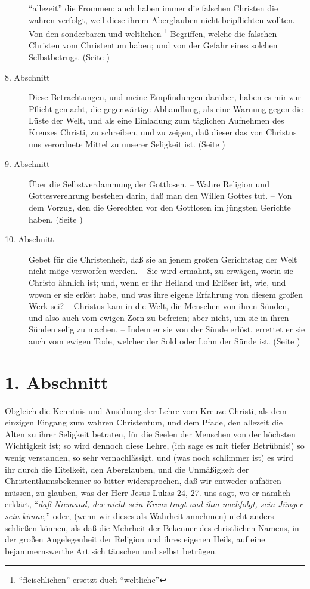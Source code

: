 \begin{description}
{"`allezeit"'} die Frommen; auch haben immer die falschen Christen die wahren
verfolgt, weil diese ihrem Aberglauben nicht beipflichten wollten. -- Von den
sonderbaren und weltlichen \footnote{"`fleischlichen"' ersetzt duch "`weltliche"'} 
Begriffen, welche die falschen Christen vom
Christentum haben; und von der Gefahr eines solchen Selbstbetrugs. (Seite
\pageref{kap1_ab7})
\item[8. Abschnitt] Diese Betrachtungen, und meine Empfindungen darüber, haben
es mir zur Pflicht gemacht, die gegenwärtige Abhandlung, als eine Warnung gegen
die Lüste der Welt, und als eine Einladung zum täglichen Aufnehmen des Kreuzes
Christi, zu schreiben, und zu zeigen, daß dieser das von Christus uns verordnete
Mittel zu unserer Seligkeit ist. (Seite \pageref{kap1_ab8})
\item[9. Abschnitt] Über die Selbstverdammung der Gottlosen. -- Wahre Religion
und Gottesverehrung  bestehen darin, daß man den 
Willen Gottes tut. -- Von dem
Vorzug, den die Gerechten vor den Gottlosen im jüngsten Gerichte haben. (Seite
\pageref{kap1_ab9})
\item[10. Abschnitt] Gebet für die Christenheit, daß sie an jenem großen
Gerichtstag der Welt nicht möge verworfen werden. -- Sie wird ermahnt, zu
erwägen, worin sie Christo ähnlich ist; und, wenn er ihr Heiland und Erlöser
ist, wie, und wovon er sie erlöst habe, und was ihre eigene Erfahrung von diesem
großen Werk sei? -- Christus kam in die Welt, die Menschen von ihren Sünden, und
also auch vom ewigen Zorn zu befreien; aber nicht, um sie in ihren Sünden selig
zu machen. -- Indem er sie von der Sünde erlöst, errettet er sie auch vom ewigen
Tode, welcher der Sold oder Lohn der Sünde ist. (Seite \pageref{kap1_ab10})
\end{description}
\normalsize


\section{1. Abschnitt} \label{kap1_ab1}

Obgleich die Kenntnis und Ausübung der Lehre vom Kreuze Christi, als dem
einzigen Eingang zum wahren Christentum, und dem Pfade, den allezeit die Alten
zu ihrer Seligkeit betraten, für die Seelen der Menschen von der höchsten
Wichtigkeit ist; so wird dennoch diese Lehre, (ich sage es mit tiefer
Betrübnis!) so wenig verstanden, so sehr vernachlässigt, und (was noch
schlimmer ist) es wird ihr durch die Eitelkeit, den Aberglauben, und die
Unmäßigkeit der Christenthumsbekenner so bitter widersprochen, daß wir entweder
aufhören müssen, zu glauben, was der Herr Jesus Lukas 24,
27. uns sagt, wo er nämlich erklärt, "`\textit{daß
Niemand, der nicht sein Kreuz tragt und ihm nachfolgt, sein Jünger sein
könne,}"' oder, (wenn wir dieses als Wahrheit annehmen) nicht anders
schließen können, als daß die Mehrheit der Bekenner des christlichen Namens, in
der großen Angelegenheit der Religion und ihres eigenen Heils, auf eine
bejammernswerthe Art sich täuschen und selbst betrügen.

